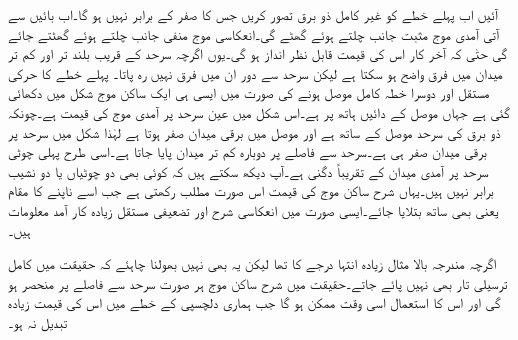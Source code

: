 آئیں اب پہلے خطے کو غیر کامل ذو برق تصور کریں جس کا  صفر کے برابر نہیں ہو گا۔اب بائیں سے آتی آمدی موج مثبت  جانب چلتے ہوئے گھٹے گی۔انعکاسی موج منفی  جانب چلتے ہوئے گھٹتے جائے گی حتٰی کہ آخر کار اس کی قیمت قابل نظر انداز ہو گی۔یوں اگرچہ سرحد کے قریب بلند تر اور کم تر میدان میں فرق  واضح ہو سکتا ہے لیکن سرحد سے دور ان میں فرق نہیں رہ پاتا۔ پہلے خطے کا حرکی مستقل  اور دوسرا خطہ کامل موصل ہونے کی صورت میں ایسی ہی ایک ساکن موج شکل  میں دکھائی گئی ہے جہاں موصل  کے دائیں ہاتھ پر ہے۔اس شکل میں عین سرحد پر آمدی
 موج کی قیمت  ہے۔چونکہ ذو برق کی سرحد موصل کے ساتھ ہے اور موصل میں برقی میدان صفر ہوتا ہے لہٰذا شکل میں سرحد پر برقی میدان صفر ہی ہے۔سرحد سے  فاصلے پر دوبارہ کم تر میدان پایا جاتا ہے۔اسی طرح  پہلی چوٹی سرحد پر آمدی میدان کے تقریباً  دگنی ہے۔آپ دیکھ سکتے ہیں کہ کوئی بھی دو چوٹیاں یا دو نشیب برابر نہیں ہیں۔یہاں شرح ساکن موج کی قیمت اس صورت مطلب رکھتی ہے جب اسے ناپنے کا مقام یعنی  بھی ساتھ بتلایا جائے۔ایسی صورت میں انعکاسی شرح اور تضعیفی مستقل زیادہ کار آمد معلومات ہیں۔

اگرچہ مندرجہ بالا مثال زیادہ انتہا درجے کا تھا لیکن یہ بھی نہیں بھولنا چاہئے کہ حقیقت میں کامل ترسیلی تار بھی نہیں پائے جاتے۔حقیقت میں شرح ساکن موج ہر صورت سرحد سے فاصلے پر منحصر ہو گی اور اس کا استعمال اسی وقت ممکن ہو گا جب ہماری دلچسپی کے خطے میں اس کی قیمت زیادہ تبدیل نہ ہو۔   

